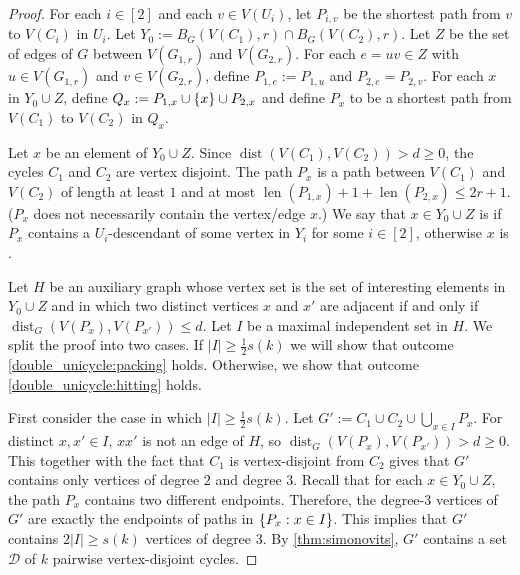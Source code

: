 \documentclass{patmorin}
\newcommand{\piotr}[1]{\textcolor{red}{Piotr: #1}}
\DeclareMathOperator{\len}{len}
\DeclareMathOperator{\dist}{dist}
\DeclarePairedDelimiter\set{\{}{\}}
\renewcommand{\mid}{:}  %
\begin{document}
\begin{proof}
    For each $i\in[2]$ and each $v\in V(U_i)$, let $P_{i,v}$ be the shortest path from $v$ to $V(C_i)$ in $U_i$. 
    Let $Y_0:=B_G(V(C_1),r)\cap B_G(V(C_2),r)$. 
    Let $Z$ be the set of edges of $G$ between $V(G_{1,r})$ and $V(G_{2,r})$.
    For each $e=uv\in Z$ with $u\in V(G_{1,r})$ and $v\in V(G_{2,r})$, define $P_{1,e}:=P_{1,u}$ and $P_{2,e}=P_{2,v}$.
    For each $x$ in $Y_0\cup Z$, define
    $Q_x:=P_{1,x}\cup\set{x}\cup P_{2,x}$ and define $P_x$ to be a shortest path from $V(C_1)$ to $V(C_2)$ in $Q_x$. 
    
    Let $x$ be an element of $Y_0\cup Z$.  Since $\dist(V(C_1),V(C_2))>d\ge 0$, the cycles $C_1$ and $C_2$ are vertex disjoint.  The path $P_x$ is a path between $V(C_1)$ and $V(C_2)$ of length at least $1$ and at most $\len(P_{1,x})+1+\len(P_{2,x})\le 2r+1$.  ($P_x$ does not necessarily contain the vertex/edge $x$.)
    We say that $x\in Y_0\cup Z$ is  if $P_x$ contains a $U_i$-descendant of some vertex in $Y_i$ for some $i\in[2]$,  otherwise $x$ is . 

    Let $H$ be an auxiliary graph whose vertex set is the set of interesting elements in $Y_0\cup Z$ and in which two distinct vertices $x$ and $x'$ are adjacent if and only if $\dist_G(V(P_x),V(P_{x'}))\leq d$.
    Let $I$ be a maximal independent set in $H$.
    We split the proof into two cases.  If
    $|I|\geq \frac{1}{2}s(k)$ we will show that outcome \cref{double_unicycle:packing} holds.  Otherwise, we show that outcome \cref{double_unicycle:hitting} holds.

    First consider the case in which $|I|\ge\tfrac{1}{2}s(k)$.
    Let $G':=C_1\cup C_2\cup\bigcup_{x\in I}P_x$.
    For distinct $x,x'\in I$, $xx'$ is not an edge of $H$, so $\dist_G(V(P_x),V(P_{x'}))>d\ge 0$.  
    This together with the fact that $C_1$ is vertex-disjoint from $C_2$ gives that $G'$ contains only vertices of degree $2$ and degree $3$. 
    Recall that for each $x\in Y_0\cup Z$, the path $P_x$ contains two different endpoints. 
    Therefore, the degree-$3$ vertices of $G'$ are exactly the endpoints of paths in $\set{P_x\mid x\in I}$.
    This implies that $G'$ contains $2|I|\geq s(k)$ vertices of degree $3$.
    By \cref{thm:simonovits}, $G'$ contains a set $\mathcal{D}$ of $k$ pairwise vertex-disjoint cycles.


\end{proof}
\end{document}
